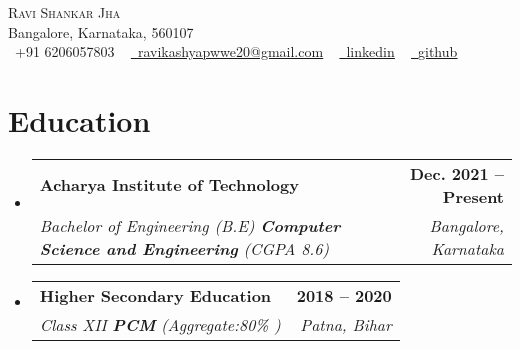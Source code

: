 \documentclass[letterpaper,11pt]{article}
\makeatletter
\newcommand{\resumeSubheading}[4]{
  \vspace{-2pt}\item
    \begin{tabular*}{1.0\textwidth}[t]{l@{\extracolsep{\fill}}r}
      \textbf{#1} & \textbf{\small #2} \\
      \textit{\small#3} & \textit{\small #4} \\
    \end{tabular*}\vspace{-7pt}
}
\newcommand{\resumeSubHeadingListStart}{\begin{itemize}[leftmargin=0.0in, label={}]}
\newcommand{\resumeSubHeadingListEnd}{\end{itemize}}
\makeatother
\begin{document}

    {\Huge \scshape Ravi Shankar Jha} \\ \vspace{1pt}
    Bangalore, Karnataka, 560107 \\ \vspace{1pt}
    \small \raisebox{-0.1\height}\faPhone\ +91 6206057803 ~ \href{mailto:ravikashyapwwe20@gmail.com}{\raisebox{-0.2\height}\faEnvelope\  \underline{ravikashyapwwe20@gmail.com}} ~
    \href{https://www.linkedin.com/in/ravi-shankar-jha-2a08941ba/}{\raisebox{-0.2\height}\faLinkedin\ \underline{linkedin}}  ~
    \href{https://github.com/kashyapravi07}{\raisebox{-0.2\height}\faGithub\ \underline{github}}\
    
    \vspace{-8pt}


\section{Education}
  \resumeSubHeadingListStart
    \resumeSubheading
      {Acharya Institute of Technology}{Dec. 2021 -- Present}
      {Bachelor of Engineering (B.E) \textbf{Computer Science and Engineering} (CGPA 8.6)}{Bangalore, Karnataka}
  \resumeSubHeadingListEnd
  \resumeSubHeadingListStart
    \resumeSubheading
      {Higher Secondary Education}{2018 -- 2020}
      {Class XII \textbf{PCM} (Aggregate:80\% )}{Patna, Bihar}
  \resumeSubHeadingListEnd

\end{document}

